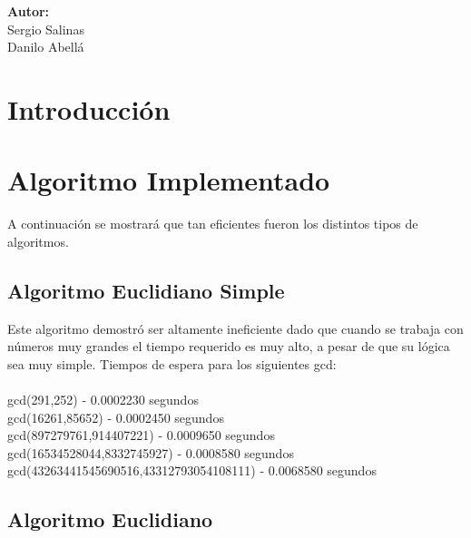 \documentclass[12pt,letterpaper]{scrartcl}
\begin{document}
\begin{titlepage}
\begin{center}
\begin{minipage}[l]{0.4\textwidth}
	\begin{flushright}

		\textbf{\textsf{Autor:}}\\
		\linespread{1}
		\large Sergio Salinas\\
		\large Danilo Abellá\\

	\end{flushright}
\end{minipage}

\end{center}

\end{titlepage}



\newpage
\section*{Introducción}


\section{Algoritmo Implementado}

A continuación se mostrará que tan eficientes fueron los distintos tipos de algoritmos.

\subsection{Algoritmo Euclidiano Simple}

Este algoritmo demostró ser altamente ineficiente dado que cuando se trabaja con números muy grandes el tiempo requerido es muy alto, a pesar de que su lógica sea muy simple.
Tiempos de espera para los siguientes gcd:
\\\\
gcd(291,252) - 0.0002230 segundos
\\
gcd(16261,85652) - 0.0002450 segundos
\\
gcd(897279761,914407221) - 0.0009650 segundos
\\
gcd(16534528044,8332745927) - 0.0008580 segundos
\\
gcd(43263441545690516,43312793054108111) - 0.0068580 segundos


\subsection{Algoritmo Euclidiano}
\end{document}

